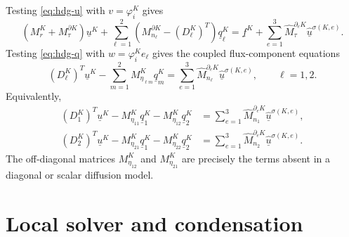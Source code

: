 \documentclass[11pt]{article}
\newcommand{\uhat}{\underline{\widehat u}}
\newcommand{\uK}{\underline u^K}
\newcommand{\qK}[1]{\underline q_{#1}^K}
\newcommand{\Mhat}{\widehat M}
\begin{document}
Testing \eqref{eq:hdg-u} with $v=\varphi_i^K$ gives
\begin{equation}\label{eq:matrix-u}
    (M_r^K+M_\tau^{\partial K})\uK
    +\sum_{\ell=1}^2
    \left(M_{n_\ell}^{\partial K}-(D_\ell^K)^T\right)\qK{\ell}
    =
    \underline f^K+
    \sum_{e=1}^3\Mhat_\tau^{\partial_eK}\uhat^{\sigma(K,e)} .
\end{equation}
Testing \eqref{eq:hdg-q} with $w=\varphi_i^K e_\ell$ gives the coupled flux-component equations
\begin{equation}\label{eq:matrix-q-component}
    (D_\ell^K)^T\uK
    -
    \sum_{m=1}^2 M_{\eta_{\ell m}}^K\qK{m}
    =
    \sum_{e=1}^3\Mhat_{n_\ell}^{\partial_eK}\uhat^{\sigma(K,e)},
    \qquad
    \ell=1,2 .
\end{equation}
Equivalently,
\begin{align}
    (D_1^K)^T\uK
    -M_{\eta_{11}}^K\qK{1}
    -M_{\eta_{12}}^K\qK{2}
        &=
    \sum_{e=1}^3\Mhat_{n_1}^{\partial_eK}\uhat^{\sigma(K,e)}, \label{eq:q1-full-tensor}\\
    (D_2^K)^T\uK
    -M_{\eta_{21}}^K\qK{1}
    -M_{\eta_{22}}^K\qK{2}
        &=
    \sum_{e=1}^3\Mhat_{n_2}^{\partial_eK}\uhat^{\sigma(K,e)}. \label{eq:q2-full-tensor}
\end{align}
The off-diagonal matrices $M_{\eta_{12}}^K$ and $M_{\eta_{21}}^K$ are precisely the terms absent in a diagonal or scalar diffusion model.

\section{Local solver and condensation}
\end{document}
